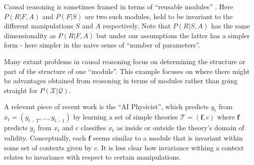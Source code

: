 Causal reasoning is sometimes framed in terms of ``reusable modules'' \cite{pearl_causality:_2009} \cite{dawid_beware_2010}. Here $P(R|F,A)$ and $P(F|S)$ are two such modules, held to be invariant to the different manipulations $S$ and $A$ respectively. Note that $P(R|S,A)$ has the same dimensionality as $P(R|F,A)$ but under our assumptions the latter has a simpler form - here simpler in the naive sense of ``number of parameters''.

Many extant problems in causal reasoning focus on determining the structure or part of the structure of one ``module''. This example focuses on where there might be advantages obtained from reasoning in terms of modules rather than going straight for $P(\mathcal{X}|\mathcal{Q})$. 

A relevant piece of recent work is the ``AI Physicist'', which predicts $y_{t}$ from $x_t=(y_{t-T},...,y_{t-1})$ by learning a set of simple theories $\mathcal{T}=(\mathbf{f},c)$ where $\mathbf{f}$ predicts $y_t$ from $x_t$ and $c$ classifies $x_t$ as inside or outside the theory's domain of validity. Conceptually, each $\mathbf{f}$ seems similar to a module that is invariant within some set of contexts given by $c$. It is less clear how invariance withing a context relates to invariance with respect to certain manipulations.




